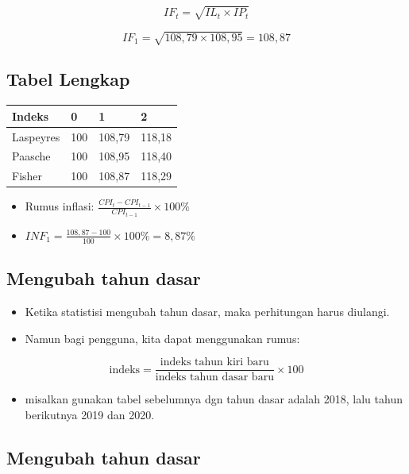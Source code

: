 \documentclass[
  letterpaper,
  DIV=11,
  numbers=noendperiod]{scrartcl}
\providecommand{\tightlist}{%
  \setlength{\itemsep}{0pt}\setlength{\parskip}{0pt}}\usepackage{longtable,booktabs,array}
\begin{document}
\[
IF_t=\sqrt{IL_t \times IP_t}
\]

\[
IF_1=\sqrt{108,79\times 108,95}=108,87
\]

\hypertarget{tabel-lengkap}{%
\subsection{Tabel Lengkap}\label{tabel-lengkap}}

\begin{longtable}[]{@{}llll@{}}
\toprule\noalign{}
Indeks & 0 & 1 & 2 \\
\midrule\noalign{}
\endhead
\bottomrule\noalign{}
\endlastfoot
Laspeyres & 100 & 108,79 & 118,18 \\
Paasche & 100 & 108,95 & 118,40 \\
Fisher & 100 & 108,87 & 118,29 \\
\end{longtable}

\begin{itemize}
\item
  Rumus inflasi: \(\frac{CPI_t-CPI_{t-1}}{CPI_{t-1}} \times 100\%\)
\item
  \(INF_1=\frac{108,87-100}{100}\times 100\%=8,87\%\)
\end{itemize}

\hypertarget{mengubah-tahun-dasar}{%
\subsection{Mengubah tahun dasar}\label{mengubah-tahun-dasar}}

\begin{itemize}
\item
  Ketika statistisi mengubah tahun dasar, maka perhitungan harus
  diulangi.
\item
  Namun bagi pengguna, kita dapat menggunakan rumus:
\end{itemize}

\[
\text{indeks}=\frac{\text{indeks tahun kiri baru}}{\text{indeks tahun dasar baru}}\times 100
\]

\begin{itemize}
\tightlist
\item
  misalkan gunakan tabel sebelumnya dgn tahun dasar adalah 2018, lalu
  tahun berikutnya 2019 dan 2020.
\end{itemize}

\hypertarget{mengubah-tahun-dasar-1}{%
\subsection{Mengubah tahun dasar}\label{mengubah-tahun-dasar-1}}
\end{document}
